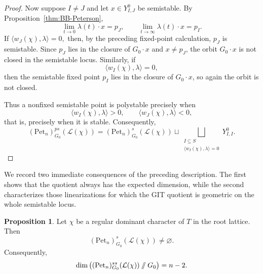 \documentclass[12pt, reqno]{amsart}
\newcommand{\sslash}{\mathbin{/\mkern-6mu/}}
\theoremstyle{plain}
\numberwithin{equation}{section}
\theoremstyle{definition}
\newtheorem{proposition}[theorem]{Proposition}
\begin{document}
\begin{proof}
Now suppose \(I\neq J\) and let \(x\in Y^0_{I,J}\) be semistable.
By Proposition~\ref{thm:BB-Peterson},
\[
\lim_{t\to0}\lambda(t)\cdot x=p_J,
\qquad
\lim_{t\to\infty}\lambda(t)\cdot x=p_I.
\]
If $\langle w_J(\chi),\lambda\rangle=0,$
then, by the preceding fixed-point calculation, \(p_J\) is
semistable. Since \(p_J\) lies in the closure of \(G_0\cdot x\) and
\(x\neq p_J\), the orbit \(G_0\cdot x\) is not closed in the
semistable locus. Similarly, if
\[
\langle w_I(\chi),\lambda\rangle=0,
\]
then the semistable fixed point \(p_I\) lies in the closure of
\(G_0\cdot x\), so again the orbit is not closed.

Thus a nonfixed semistable point is polystable precisely when
\[
\langle w_I(\chi),\lambda\rangle>0,
\qquad
\langle w_J(\chi),\lambda\rangle<0,
\]
that is, precisely when it is stable. Consequently,
\[
(\mathrm{Pet}_n)^{ps}_{G_0}(\mathcal L(\chi))
=
(\mathrm{Pet}_n)^s_{G_0}(\mathcal L(\chi))
\sqcup
\bigsqcup_{\substack{I\subseteq S\\
\langle w_I(\chi),\lambda\rangle=0}}
Y^0_{I,I}.
\]
\end{proof}

We record two immediate consequences of the preceding description.
The first shows that the quotient always has the expected dimension,
while the second characterizes those linearizations for which the
GIT quotient is geometric on the whole semistable locus.

\begin{proposition}\label{lem:stability-nonempty}
Let $\chi$ be a regular dominant character of $T$ in the root lattice. Then
\[
(\mathrm{Pet}_n)^s_{G_0}(\mathcal L(\chi))\neq\varnothing.
\]
Consequently,
\[
\dim\left(
(\mathrm{Pet}_n)^{ss}_{G_0}(\mathcal L(\chi))
\sslash G_0
\right)
=
n-2.
\]
\end{proposition}
\end{document}
